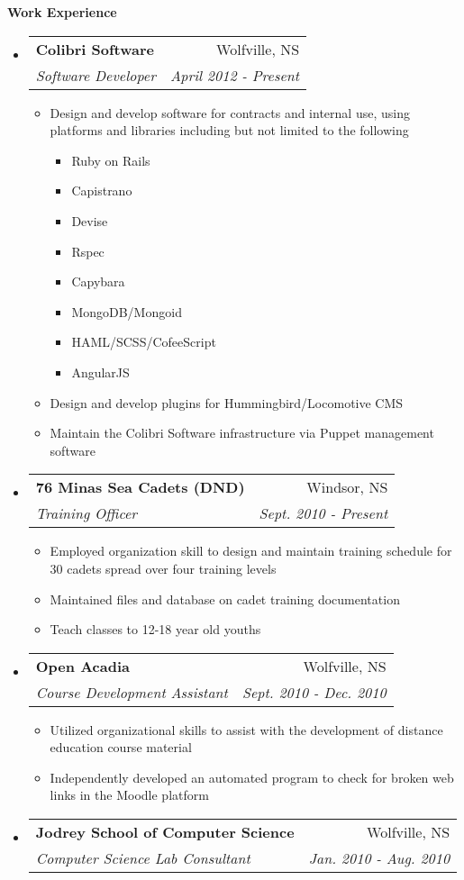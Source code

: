 \documentclass[letterpaper,11pt]{article}
\makeatletter
\newcommand{\resitem}[1]{\item #1 \vspace{-2pt}}
\newcommand{\resheading}[1]{{\large \colorbox{mygrey}{\begin{minipage}{\textwidth}{\textbf{#1 \vphantom{p\^{E}} }}\end{minipage}} }}
\newcommand{\ressubheading}[4]{
\begin{tabular*}{6.5in}{l@{\extracolsep{\fill}}r}
        \textbf{#1} & #2 \\
        \textit{#3} & \textit{#4} \\
\end{tabular*}\vspace{-6pt}}
\makeatother
\begin{document}
\newpage
\mywebheader
\resheading{Work Experience} %
    \begin{itemize}
        \item[]
            \ressubheading{Colibri Software}{Wolfville, NS}{Software Developer}{April 2012 - Present}
                \begin{itemize}
                    \resitem{Design and develop software for contracts and internal use, using platforms and libraries including but not limited to the following}
                    \begin{itemize}
                      \resitem{Ruby on Rails}
                      \resitem{Capistrano}
                      \resitem{Devise}
                      \resitem{Rspec}
                      \resitem{Capybara}
                      \resitem{MongoDB/Mongoid}
                      \resitem{HAML/SCSS/CofeeScript}
                      \resitem{AngularJS}
                    \end{itemize}
                    \resitem{Design and develop plugins for Hummingbird/Locomotive CMS}
                    \resitem{Maintain the Colibri Software infrastructure via Puppet management software}
                \end{itemize}
        \item[]
            \ressubheading{76 Minas Sea Cadets (DND)}{Windsor, NS}{Training Officer}{Sept. 2010 - Present}
                \begin{itemize}
                    \resitem{Employed organization skill to design and maintain training schedule for 30 cadets spread over four training levels}
                    \resitem{Maintained files and database on cadet training documentation}
                    \resitem{Teach classes to 12-18 year old youths}
                \end{itemize}
        \item[]
            \ressubheading{Open Acadia}{Wolfville, NS}{Course Development Assistant}{Sept. 2010 - Dec. 2010}
                \begin{itemize}
                    \resitem{Utilized organizational skills to assist with the development of distance education course material}
                    \resitem{Independently developed an automated program to check for broken web links in the Moodle platform}
                \end{itemize}
        \item[]
            \ressubheading{Jodrey School of Computer Science}{Wolfville, NS}{Computer Science Lab Consultant}{Jan. 2010 - Aug. 2010}

\end{itemize}
\end{document}
